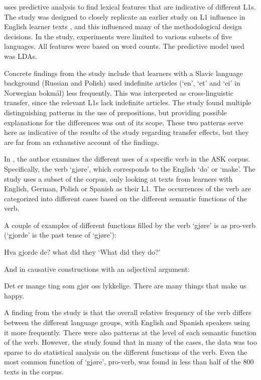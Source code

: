 \textcite{pepper2012} uses predictive analysis to find lexical features that
are indicative of different \acp{L1}. The study was designed to closely
replicate an earlier study on \ac{L1} influence in English learner texts
\autocite{jarvis2012detecting}, and this influenced many of the
methodological design decisions. In the \citeauthor{pepper2012} study,
experiments were limited to various subsets of five languages. All features
were based on word counts. The predictive model used was \acp{LDA}.

Concrete findings from the \citeauthor{pepper2012} study include that
learners with a Slavic language background (Russian and Polish) used
indefinite articles (`en', `et' and `ei' in Norwegian bokmål) less
frequently. This was interpreted as cross-linguistic transfer, since the
relevant \acp{L1} lack indefinite articles. The study found multiple
distinguishing patterns in the use of prepositions, but providing possible
explanations for the differences was out of its scope. These two patterns
serve here as indicative of the results of the study regarding transfer
effects, but they are far from an exhaustive account of the findings.

In \textcite{golden2016ask}, the author examines the different uses of a
specific verb in the ASK corpus. Specifically, the verb `gjøre', which
corresponds to the English `do' or `make'. The study uses a subset of the
corpus, only looking at texts from learners with English, German, Polish or
Spanish as their \ac{L1}. The occurrences of the verb are categorized into
different cases based on the different semantic functions of the verb.

A couple of examples of different functions filled by the verb `gjøre' is
as pro-verb (`gjorde' is the past tense of `gjøre'):

\begin{example}
\gll Hva  gjorde  de?
     what did     they
\glt `What did they do?'
\glend
\end{example}

And in causative constructions with an adjectival argument:

\begin{example}
\gll Det   er  mange ting   som  gjør oss lykkelige.
     There are many  things that make us  happy.
\gln
\glend
\end{example}

A finding from the study is that the overall relative frequency of the verb
differs between the different language groups, with English and Spanish
speakers using it more frequently. There were also patterns at the level of
each semantic function of the verb. However, the study found that in many of
the cases, the data was too sparse to do statistical analysis on the
different functions of the verb. Even the most common function of `gjøre',
pro-verb, was found in less than half of the 800 texts in the corpus.

